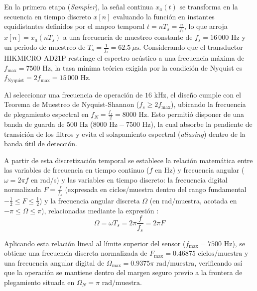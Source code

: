 \documentclass[journal, a4paper]{IEEEtran}
\begin{document}
En la primera etapa (\textit{Sampler}), la señal continua $x_a(t)$ se transforma en la secuencia en tiempo discreto $x[n]$ evaluando la función en instantes equidistantes definidos por el mapeo temporal $t = n T_s = \frac{n}{f_s}$, lo que arroja $x[n] = x_a(n T_s)$ a una frecuencia de muestreo constante de $f_s = 16\,000 \text{ Hz}$ y un periodo de muestreo de $T_s = \frac{1}{f_s} = 62.5\ \mu\text{s}$. Considerando que el transductor HIKMICRO AD21P restringe el espectro acústico a una frecuencia máxima de $f_{\max} = 7500 \text{ Hz}$, la tasa mínima teórica exigida por la condición de Nyquist es $f_{\text{Nyquist}} = 2 f_{\max} = 15\,000 \text{ Hz}$.

Al seleccionar una frecuencia de operación de $16 \text{ kHz}$, el diseño cumple con el Teorema de Muestreo de Nyquist-Shannon ($f_s \ge 2 f_{\max}$), ubicando la frecuencia de plegamiento espectral en $f_N = \frac{f_s}{2} = 8000 \text{ Hz}$. Esto permitió disponer de una banda de guarda de $500 \text{ Hz}$ ($8000 \text{ Hz} - 7500 \text{ Hz}$), la cual absorbe la pendiente de transición de los filtros y evita el solapamiento espectral (\textit{aliasing}) dentro de la banda útil de detección.

A partir de esta discretización temporal se establece la relación matemática entre las variables de frecuencia en tiempo continuo ($f$ en Hz) y frecuencia angular ($\omega = 2\pi f$ en rad/s) y las variables en tiempo discreto: la frecuencia digital normalizada $F = \frac{f}{f_s}$ (expresada en ciclos/muestra dentro del rango fundamental $-\frac{1}{2} \le F \le \frac{1}{2}$) y la frecuencia angular discreta $\Omega$ (en rad/muestra, acotada en $-\pi \le \Omega \le \pi$), relacionadas mediante la expresión \cite{Proakis}:
\begin{equation}
    \Omega = \omega T_s = 2\pi \frac{f}{f_s} = 2\pi F
\end{equation}

Aplicando esta relación lineal al límite superior del sensor ($f_{\max} = 7500\text{ Hz}$), se obtiene una frecuencia discreta normalizada de $F_{\max} = 0.46875\text{ ciclos/muestra}$ y una frecuencia angular digital de $\Omega_{\max} = 0.9375\pi\text{ rad/muestra}$, verificando así que la operación se mantiene dentro del margen seguro previo a la frontera de plegamiento situada en $\Omega_N = \pi\text{ rad/muestra}$.
\end{document}
